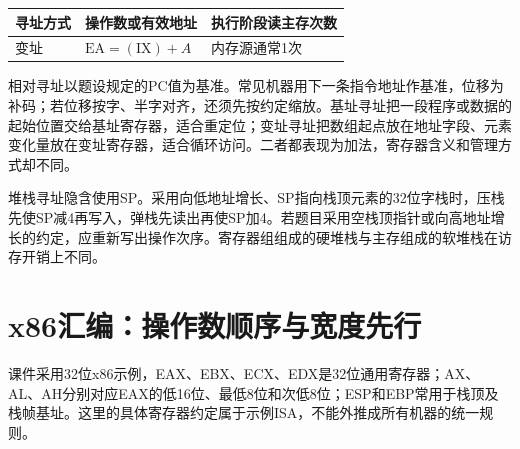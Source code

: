 \par\medskip\noindent\begin{minipage}{\linewidth}\fontsize{9.3}{12}\selectfont\begin{tabularx}{\linewidth}{@{}YYY@{}}
\toprule\noalign{}
\begin{minipage}[b]{\linewidth}\raggedright
寻址方式
\end{minipage} & \begin{minipage}[b]{\linewidth}\raggedright
操作数或有效地址
\end{minipage} & \begin{minipage}[b]{\linewidth}\raggedright
执行阶段读主存次数
\end{minipage} \\
\midrule\noalign{}


变址 & \(\mathrm{EA}=(\mathrm{IX})+A\) & 内存源通常1次 \\
\bottomrule\end{tabularx}
\end{minipage}\par\medskip

相对寻址以题设规定的PC值为基准。常见机器用下一条指令地址作基准，位移为补码；若位移按字、半字对齐，还须先按约定缩放。基址寻址把一段程序或数据的起始位置交给基址寄存器，适合重定位；变址寻址把数组起点放在地址字段、元素变化量放在变址寄存器，适合循环访问。二者都表现为加法，寄存器含义和管理方式却不同。

堆栈寻址隐含使用SP。采用向低地址增长、SP指向栈顶元素的32位字栈时，压栈先使SP减4再写入，弹栈先读出再使SP加4。若题目采用空栈顶指针或向高地址增长的约定，应重新写出操作次序。寄存器组组成的硬堆栈与主存组成的软堆栈在访存开销上不同。

\section{x86汇编：操作数顺序与宽度先行}\label{CO04-x86-complete}

课件采用32位x86示例，EAX、EBX、ECX、EDX是32位通用寄存器；AX、AL、AH分别对应EAX的低16位、最低8位和次低8位；ESP和EBP常用于栈顶及栈帧基址。这里的具体寄存器约定属于示例ISA，不能外推成所有机器的统一规则。

